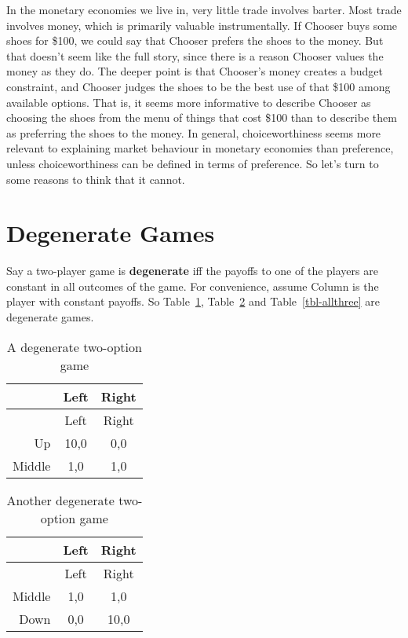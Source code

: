 \documentclass[
  11pt,
  letterpaper,
  DIV=11,
  numbers=noendperiod,
  twoside]{scrartcl}
\begin{document}
In the monetary economies we live in, very little trade involves barter.
Most trade involves money, which is primarily valuable instrumentally.
If Chooser buys some shoes for \$100, we could say that Chooser prefers
the shoes to the money. But that doesn't seem like the full story, since
there is a reason Chooser values the money as they do. The deeper point
is that Chooser's money creates a budget constraint, and Chooser judges
the shoes to be the best use of that \$100 among available options. That
is, it seems more informative to describe Chooser as choosing the shoes
from the menu of things that cost \$100 than to describe them as
preferring the shoes to the money. In general, choiceworthiness seems
more relevant to explaining market behaviour in monetary economies than
preference, unless choiceworthiness can be defined in terms of
preference. So let's turn to some reasons to think that it cannot.

\section{Degenerate Games}\label{sec-games}

Say a two-player game is \textbf{degenerate} iff the payoffs to one of
the players are constant in all outcomes of the game. For convenience,
assume Column is the player with constant payoffs. So
Table~\ref{tbl-upmid}, Table~\ref{tbl-middown} and
Table~\ref{tbl-allthree} are degenerate games.

\begin{longtable}[]{@{}rcc@{}}
\caption{A degenerate two-option game}\label{tbl-upmid}\tabularnewline
\toprule\noalign{}
& Left & Right \\
\midrule\noalign{}
\endfirsthead
\toprule\noalign{}
& Left & Right \\
\midrule\noalign{}
\endhead
\bottomrule\noalign{}
\endlastfoot
Up & 10,0 & 0,0 \\
Middle & 1,0 & 1,0 \\
\end{longtable}

\begin{longtable}[]{@{}rcc@{}}
\caption{Another degenerate two-option
game}\label{tbl-middown}\tabularnewline
\toprule\noalign{}
& Left & Right \\
\midrule\noalign{}
\endfirsthead
\toprule\noalign{}
& Left & Right \\
\midrule\noalign{}
\endhead
\bottomrule\noalign{}
\endlastfoot
Middle & 1,0 & 1,0 \\
Down & 0,0 & 10,0 \\
\end{longtable}
\end{document}
